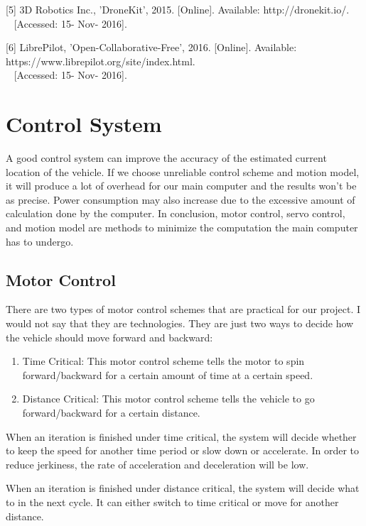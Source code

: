 \documentclass[compsoc,draftclsnofoot,onecolumn,10pt]{IEEEtran}
\begin{document}
[5] 3D Robotics Inc., 'DroneKit', 2015. [Online]. Available: http://dronekit.io/.\\~
[Accessed: 15- Nov- 2016].\par

[6] LibrePilot, 'Open-Collaborative-Free', 2016. [Online]. Available: https://www.librepilot.org/site/index.html.\\~
[Accessed: 15- Nov- 2016].\par


\newpage

\section{Control System}
A good control system can improve the accuracy of the estimated current location 
of the vehicle. If we choose unreliable control scheme and motion model, it will 
produce a lot of overhead for our main computer and the results won't be as precise. 
Power consumption may also increase due to the excessive amount of calculation done 
by the computer. In conclusion, motor control, servo control, and motion model are 
methods to minimize the computation the main computer has to undergo.

\subsection{Motor Control}
There are two types of motor control schemes that are practical for our project. 
I would not say that they are technologies. They are just two ways to decide 
how the vehicle should move forward and backward:
\begin{enumerate}
\item Time Critical: This motor control scheme tells the motor to spin 
forward/backward for a certain amount of time at a certain speed.
\item Distance Critical: This motor control scheme tells the vehicle to go 
forward/backward for a certain distance.
\end{enumerate}
When an iteration is finished under time critical, the system will decide whether 
to keep the speed for another time period or slow down or accelerate. In order 
to reduce jerkiness, the rate of acceleration and deceleration will be low.\par

When an iteration is finished under distance critical, the system will decide what 
to in the next cycle. It can either switch to time critical or move for another 
distance.\par
\end{document}
